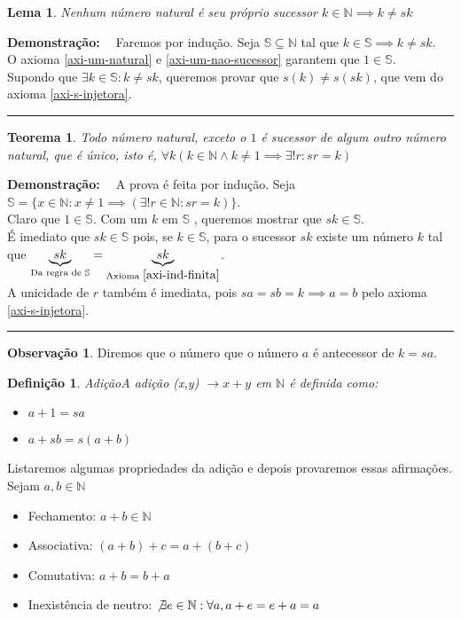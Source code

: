 \documentclass[
	12pt,				%
	oneside,			%
	a4paper,			%
	english,			%
	french,				%
	spanish,			%
	brazil,				%
	]{abntex2}
\newcommand{\N}{\ensuremath {\mathbb{N}} }
\renewcommand{\S}{\ensuremath {\mathbb{S}} }
\theoremstyle{plain}
\newtheorem{teo}{Teorema}[chapter]
\newtheorem{lema}{Lema}[chapter]
\newtheorem{defi}{Definição}[chapter]
\theoremstyle{definition}
\newtheorem{obs}{Observação}[chapter]
\newenvironment{dem}[1][\textbf{Demonstração:} \ ]{\textbf{#1}}{\hfill\rule{2mm}{2mm}}
\begin{document}
\begin{lema}{Nenhum número natural é seu próprio sucessor}
    $k \in \N \implies k \neq sk $
\end{lema}
\begin{dem}
    Faremos por indução. Seja $\S \subseteq \N$ tal que $k \in \S \implies k \neq sk$.\\
    O axioma \ref{axi-um-natural} e \ref{axi-um-nao-sucessor} garantem que $1 \in \S$.\\
    Supondo que $\exists k \in \S : k \neq sk$, queremos provar que $s(k) \neq s(sk)$, que vem do axioma \ref{axi-s-injetora}.
\end{dem}
\begin{teo}
    Todo número natural, exceto o $1$ é sucessor de algum outro número natural, que é único, isto é, $\forall k (k \in \N \land k \neq 1 \implies \exists! r : sr = k)$
\end{teo}
\begin{dem}
    A prova é feita por indução. Seja $\S = \{x \in \N : x \neq 1 \implies (\exists!r \in \N : sr = k)\}$.\\
    Claro que $1 \in \S$. Com um $k$ em  \S, queremos mostrar que $sk \in \S$. \\
    É imediato que $sk \in \S$ pois, se $k \in \S$, para o sucessor $sk$ existe um número $k$ tal que $\underbrace{sk}_{\text{Da regra de } \S} = \underbrace{sk}_{\text{Axioma }\ref{axi-ind-finita}}$.\\
    A unicidade de $r$ também é imediata, pois $sa = sb = k \implies a = b$ pelo axioma \ref{axi-s-injetora}.
\end{dem}
\begin{obs}
    Diremos que o número que o número $a$ é antecessor de $k = sa$.
\end{obs}
\begin{defi}{Adição}\label{adicao}
A adição (x,y) $\rightarrow x + y$ em \N é definida como: 
    \begin{itemize}
        \item $a + 1 = sa$
        \item $a + sb = s(a+b)$
    \end{itemize}
\end{defi}

Listaremos algumas propriedades da adição e depois provaremos essas afirmações. Sejam $a, b \in \N$
\begin{itemize}
    \item Fechamento: $a + b \in \N$
	\item Associativa: $(a + b) + c = a + (b + c)$
	\item Comutativa: $a + b =  b + a$
	\item Inexistência de neutro: $\not\exists e \in \N : \forall a, a + e = e + a = a$
\end{itemize}
\end{document}
